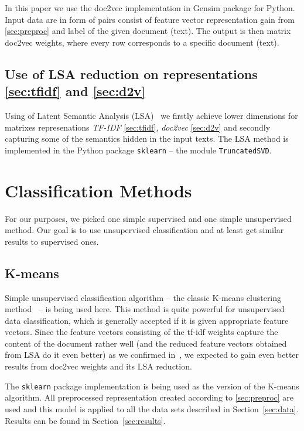\documentclass[runningheads,a4paper]{llncs}
\begin{document}
In this paper we use the doc2vec implementation in Gensim package \cite{gens} for Python. Input data are in form of pairs consist of feature vector representation gain from \ref{sec:preproc} and label of the given document (text). The output is then matrix doc2vec weights, where every row corresponds to a specific document (text).  

\subsection{Use of LSA reduction on representations \ref{sec:tfidf} and \ref{sec:d2v}}
\label{sec:lsared}
Using of Latent Semantic Analysis (LSA)~\cite{lsaIntro} we firstly achieve lower dimensions for matrixes represenations \emph{TF-IDF} \ref{sec:tfidf}, \emph{doc2vec} \ref{sec:d2v} and secondly capturing some of the semantics hidden in the input texts. The LSA method is implemented in the Python package \texttt{sklearn} --  the module \texttt{TruncatedSVD}.

\section{Classification Methods}
\label{sec:class}
For our purposes, we picked one simple supervised and one simple unsupervised method. Our goal is to use unsupervised classification and at least get similar results to supervised ones.
\subsection{K-means}
\label{subsec:kmeans}
Simple unsupervised classification algorithm -- the classic K-means clustering method~\cite{kmeans} -- is being used here. This method is quite powerful for unsupervised data classification, which is generally accepted if it is given appropriate feature vectors. Since the feature vectors consisting of the tf-idf weights capture the content of the document rather well (and the reduced feature vectors obtained from LSA do it even better) as we confirmed in~\cite{novotny2017unsupervised}, we expected to gain even better results from doc2vec weights and its LSA reduction.

The \texttt{sklearn} package implementation is being used as the version of the K-means algorithm. All preprocessed representation created according to \ref{sec:preproc} are used and this model is applied to all the data sets described in Section~\ref{sec:data}. Results can be found in Section~\ref{sec:results}. 
\end{document}

